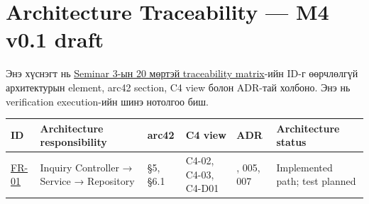 \documentclass[
  mongolian,
]{article}
\begin{document}
\newpage

\section{Architecture Traceability --- M4 v0.1
draft}\label{architecture-traceability-m4-v0.1-draft}

Энэ хүснэгт нь
\href{https://github.com/Tengis01/Nogoolin/blob/main/docs/requirements/traceability-matrix-v1.0.md}{Seminar
3-ын 20 мөртэй traceability matrix}-ийн ID-г өөрчлөлгүй архитектурын
element, arc42 section, C4 view болон ADR-тай холбоно. Энэ нь
verification execution-ийн шинэ нотолгоо биш.

\begingroup\footnotesize\setlength{\tabcolsep}{2pt}\sloppy

\begin{longtable}[]{@{}
  >{\raggedright\arraybackslash}p{}
  >{\raggedright\arraybackslash}p{}
  >{\raggedright\arraybackslash}p{}
  >{\raggedright\arraybackslash}p{}
  >{\raggedright\arraybackslash}p{}
  >{\raggedright\arraybackslash}p{}@{}}
\toprule\noalign{}
\begin{minipage}[b]{\linewidth}\raggedright
ID
\end{minipage} & \begin{minipage}[b]{\linewidth}\raggedright
Architecture responsibility
\end{minipage} & \begin{minipage}[b]{\linewidth}\raggedright
arc42
\end{minipage} & \begin{minipage}[b]{\linewidth}\raggedright
C4 view
\end{minipage} & \begin{minipage}[b]{\linewidth}\raggedright
ADR
\end{minipage} & \begin{minipage}[b]{\linewidth}\raggedright
Architecture status
\end{minipage} \\
\midrule\noalign{}
\endhead
\bottomrule\noalign{}
\endlastfoot
\href{https://github.com/Tengis01/Nogoolin/blob/main/docs/requirements/srs-v1.0.md\#fr-01--зочны-inquiry-үүсгэх}{FR-01}
& Inquiry Controller → Service → Repository & §5, §6.1 & C4-02, C4-03,
C4-D01 & 003, 005, 007 & Implemented path; test planned \\

\end{longtable}
\end{document}
